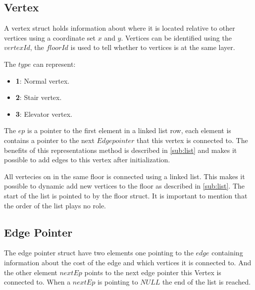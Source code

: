 \begin{minipage}{\linewidth}
\subsection{Vertex}\label{data_struct:vertex}
A vertex struct holds information about where it is located relative to other vertices using a coordinate set $x$ and $y$. Vertices can be identified using the $vertexId$, the $floorId$ is used to tell whether to vertices is at the same layer.

 The $type$ can represent:
\begin{itemize}[noitemsep]
	\item \textbf{1}: Normal vertex.
	\item \textbf{2}: Stair vertex.
	\item \textbf{3}: Elevator vertex.
\end{itemize}

The $ep$ is a pointer to the first element in a linked list row, each element is contains a pointer to the next $Edge pointer$ that this vertex is connected to. The benefits of this representations method is described in \cref{sub:list} and makes it possible to add edges to this vertex after initialization.


All vertecies on in the same floor is connected using a linked list. This makes it possible to dynamic add new vertices to the floor as described in \cref{sub:list}. The start of the list is pointed to by the floor struct. It is important to mention that the order of the list plays no role.   


 \label{vertex_struct}
\end{minipage}

\begin{minipage}{\linewidth}
\subsection{Edge Pointer}

The edge pointer struct have two elements one pointing to the $edge$ containing information about the cost of the edge and which vertices it is connected to. And the other element $nextEp$ points to the next edge pointer this Vertex is connected to. When a $nextEp$ is pointing to $NULL$ the end of the list is reached.
 \label{ep_struct}

\end{minipage}



